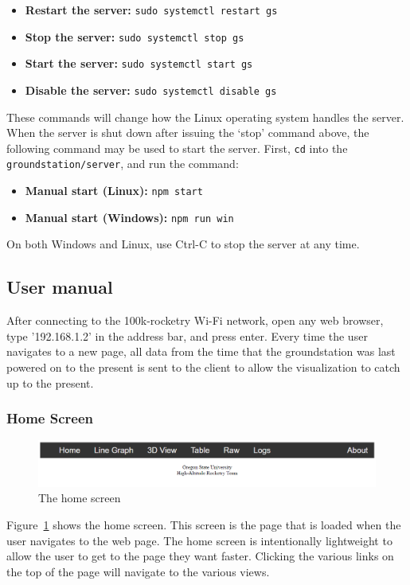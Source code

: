 \documentclass[10pt,draftclsnofoot,onecolumn]{IEEEtran}
\begin{document}
\begin{itemize}
\item\textbf{Restart the server:} \texttt{sudo systemctl restart gs}
\item\textbf{Stop the server:} \texttt{sudo systemctl stop gs}
\item\textbf{Start the server:} \texttt{sudo systemctl start gs}
\item\textbf{Disable the server:} \texttt{sudo systemctl disable gs}
\end{itemize}
These commands will change how the Linux operating system handles the server.
When the server is shut down after issuing the `stop' command above,
the following command may be used to start the server. First, \texttt{cd} into
the \texttt{groundstation/server}, and run the command:

\begin{itemize}
\item\textbf{Manual start (Linux):} \texttt{npm start}
\item\textbf{Manual start (Windows):} \texttt{npm run win}
\end{itemize}

On both Windows and Linux, use Ctrl-C to stop the server at any time.

\subsection{User manual}
After connecting to the 100k-rocketry Wi-Fi network, open any web browser, type '192.168.1.2'
in the address bar, and press enter.
Every time the user navigates to a new page, all data from the time that the groundstation was
last powered on to the present is sent to the client to allow the visualization to catch up
to the present.

\subsubsection{Home Screen}
	\begin{figure}[thbp!]
		\centering\includegraphics[width=170mm]{gs-header}
		\caption{The home screen}
		\label{gs-home}
	\end{figure}
	
Figure~\ref{gs-home} shows the home screen.
This screen is the page that is loaded when the user navigates to the web page.
The home screen is intentionally lightweight to allow the user to get to
the page they want faster.
Clicking the various links on the top of the page will navigate to the various views.
\end{document}
